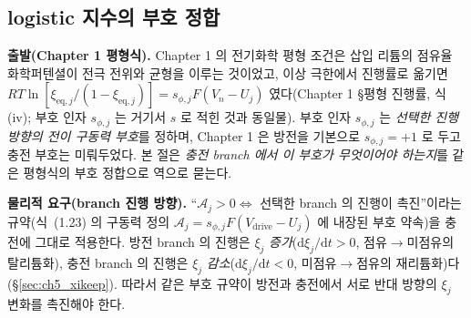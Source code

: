 \documentclass[11pt,a4paper]{article}
\newcommand{\dd}{\mathrm{d}}
\newcommand{\eq}{\mathrm{eq}}
\newcommand{\drive}{\mathrm{drive}}
\begin{document}
\subsection{logistic 지수의 부호 정합}\label{sec:ch5_sign_derive}
\textbf{출발(Chapter 1 평형식).} Chapter 1 의 전기화학 평형 조건은 삽입 리튬의 점유율 화학퍼텐셜이 전극 전위와
균형을 이루는 것이었고, 이상 극한에서 진행률로 옮기면 $RT\ln[\xi_{\eq,j}/(1-\xi_{\eq,j})]=s_{\phi,j}F(V_n-U_j)$
였다(Chapter 1 \S 평형 진행률, 식 (iv); 부호 인자 $s_{\phi,j}$ 는 거기서 $s$ 로 적힌 것과 동일물). 부호 인자
$s_{\phi,j}$ 는 \emph{선택한 진행 방향의 전이 구동력 부호}를 정하며, Chapter 1 은 방전을 기본으로 $s_{\phi,j}=+1$
로 두고 충전 부호는 미뤄두었다. 본 절은 \emph{충전 branch 에서 이 부호가 무엇이어야 하는지}를 같은 평형식의 부호
정합으로 역으로 묻는다.

\textbf{물리적 요구(branch 진행 방향).} ``$\mathcal A_j>0\Leftrightarrow$ 선택한 branch 의 진행이 촉진''이라는
규약(식~(1.23) 의 구동력 정의 $\mathcal A_j=s_{\phi,j}F(V_\drive-U_j)$ 에 내장된 부호 약속)을 충전에 그대로
적용한다. 방전 branch 의 진행은 $\xi_j$ \emph{증가}($\dd\xi_j/\dd t>0$, 점유$\to$미점유의 탈리튬화), 충전 branch
의 진행은 $\xi_j$ \emph{감소}($\dd\xi_j/\dd t<0$, 미점유$\to$점유의 재리튬화)다(\S\ref{sec:ch5_xikeep}). 따라서
같은 부호 규약이 방전과 충전에서 서로 반대 방향의 $\xi_j$ 변화를 촉진해야 한다.
\end{document}
